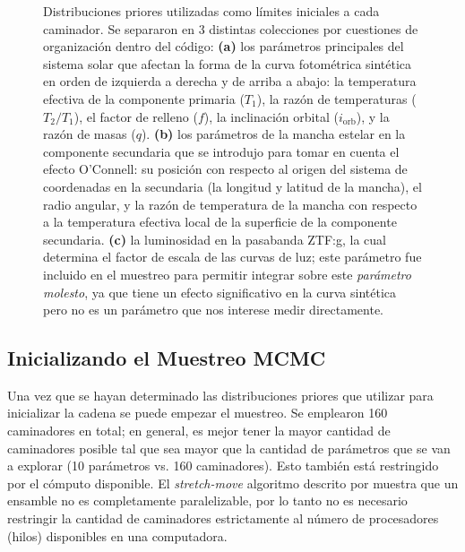\begin{figure}[!ht]
	\centering
	\caption{Distribuciones priores utilizadas como límites iniciales a cada
	caminador. Se separaron en 3 distintas colecciones por cuestiones de
	organización dentro del código: \textbf{(a)} los parámetros principales del
	sistema solar que afectan la forma de la curva fotométrica sintética en
	orden de izquierda a derecha y de arriba a abajo: la temperatura efectiva de
	la componente primaria ($T_{1}$), la razón de temperaturas ($T_2/T_1$), el
	factor de relleno ($f$), la inclinación orbital ($i_{\mathrm{orb}}$), y la
	razón de masas ($q$). \textbf{(b)} los parámetros de la mancha estelar en la
	componente secundaria que se introdujo para tomar en cuenta el efecto
	O'Connell: su posición con respecto al origen del sistema de coordenadas en
	la secundaria (la longitud y latitud de la mancha), el radio angular, y la
	razón de temperatura de la mancha con respecto a la temperatura efectiva
	local de la superficie de la componente secundaria. \textbf{(c)} la
	luminosidad en la pasabanda ZTF:g, la cual determina el factor de escala de
	las curvas de luz; este parámetro fue incluido en el muestreo para permitir
	integrar sobre este \textit{parámetro molesto}, ya que tiene un efecto
	significativo en la curva sintética pero no es un parámetro que nos interese
	medir directamente.}
	\label{figuraColeccionesPrioresZtf}
\end{figure}

\subsection{Inicializando el Muestreo MCMC}

Una vez que se hayan determinado las distribuciones priores que utilizar para
inicializar la cadena se puede empezar el muestreo. Se emplearon 160 caminadores
en total; en general, es mejor tener la mayor cantidad de caminadores posible
tal que sea mayor que la cantidad de parámetros que se van a explorar (10
parámetros vs. 160 caminadores). Esto también está restringido por el cómputo
disponible. El \textit{stretch-move} algoritmo descrito por
 muestra que un ensamble no es
completamente paralelizable, por lo tanto no es necesario restringir la cantidad
de caminadores estrictamente al número de procesadores (hilos) disponibles en
una computadora. 

